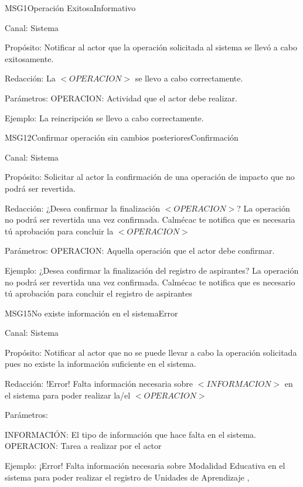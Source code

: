 \begin{mensaje}{MSG1}{Operación Exitosa}{Informativo }
	\item[Canal:] Sistema
	\item[Propósito:] Notificar al actor que la operación solicitada al sistema se llevó a cabo exitosamente.
	\item[Redacción:] La $<OPERACION>$ se llevo a cabo correctamente.
	\item[Parámetros:] OPERACION: Actividad que el actor debe realizar.
	\item[Ejemplo:] La reincripción se llevo a cabo correctamente.
\end{mensaje}

\begin{mensaje}{MSG12}{Confirmar operación sin cambios posteriores}{Confirmación}
	\item[Canal:] Sistema
	\item[Propósito:] Solicitar al actor la confirmación de una operación de impacto que no podrá ser revertida.
	\item[Redacción:] ¿Desea confirmar la finalización $<OPERACION>$? La operación no podrá ser revertida una vez confirmada.
	Calmécac te notifica que es necesaria tú aprobación para concluir la $<OPERACION>$
	\item[Parámetros:] OPERACION: Aquella operación que el actor debe confirmar.
	\item[Ejemplo:] ¿Desea confirmar la finalización del registro de aspirantes? La operación no podrá ser revertida una vez confirmada.
	Calmécac te notifica que es necesario tú aprobación para concluir el registro de aspirantes
	
\end{mensaje}

\begin{mensaje}{MSG15}{No	 existe información en el sistema}{Error}
	\item[Canal:] Sistema
	\item[Propósito:] Notificar al actor que no se puede llevar a cabo la operación solicitada pues no existe la información suficiente en el sistema.
	\item[Redacción:] !Error! Falta información necesaria sobre $<INFORMACION>$ en el sistema para poder realizar la/el $<OPERACION>$ \\
	\item[Parámetros:] 
	\begin{Titemize}
		\Titem INFORMACIÓN: El tipo de información que hace falta en el sistema.
		\Titem OPERACION: Tarea a realizar por el actor
	\end{Titemize}
	\item[Ejemplo:] ¡Error! Falta información necesaria sobre Modalidad Educativa en el sistema para poder realizar el registro de Unidades de Aprendizaje
	, 
\end{mensaje}

